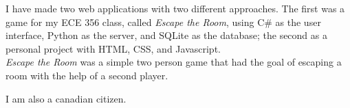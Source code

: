 \documentclass[10pt,a4paper,ragged2e,withhyper]{altacv}
\begin{document}
I have made two web applications with two different approaches. The first was a game for my ECE 356 class, called \textit{Escape the Room}, using C\# as the user interface, Python as the server, and SQLite as the database; the second as a personal project with HTML, CSS, and Javascript. \linebreak \\

\textit{Escape the Room} was a simple two person game that had the goal of escaping a room with the help of a second player.

I am also a canadian citizen. 




\end{document}
